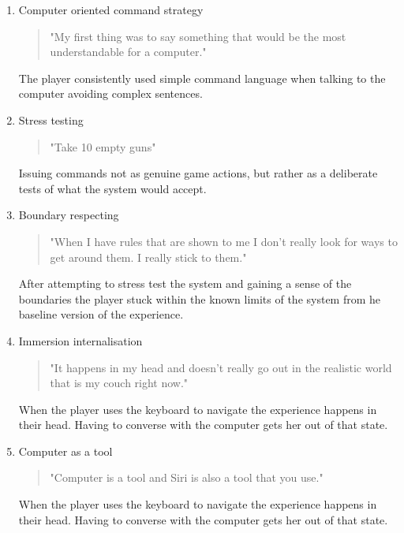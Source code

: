\begin{enumerate}
    \item Computer oriented command strategy
    
        \begin{quote}
            "My first thing was to say something that would be the most understandable for a computer." 
        \end{quote}
        The player consistently used simple command language when talking to the computer avoiding complex sentences.
    

    \item Stress testing
    
        \begin{quote}
            "Take 10 empty guns"
        \end{quote}
        Issuing commands not as genuine game actions, but rather as a deliberate tests of what the system would accept. 

        \item Boundary respecting
    
        \begin{quote}
            "When I have rules that are shown to me I don't really look for ways to get around them. I really stick to them." 
        \end{quote}
        After attempting to stress test the system and gaining a sense of the boundaries the player stuck within the known limits of the system from he baseline version of the experience.


        \item Immersion internalisation
    
        \begin{quote}
            "It happens in my head and doesn't really go out in the realistic world that is my couch right now."
        \end{quote}
        When the player uses the keyboard to navigate the experience happens in their head. Having to converse with the computer gets her out of that state.


        \item Computer as a tool
    
        \begin{quote}
            "Computer is a tool and Siri is also a tool that you use."
        \end{quote}
        When the player uses the keyboard to navigate the experience happens in their head. Having to converse with the computer gets her out of that state.



\end{enumerate}
